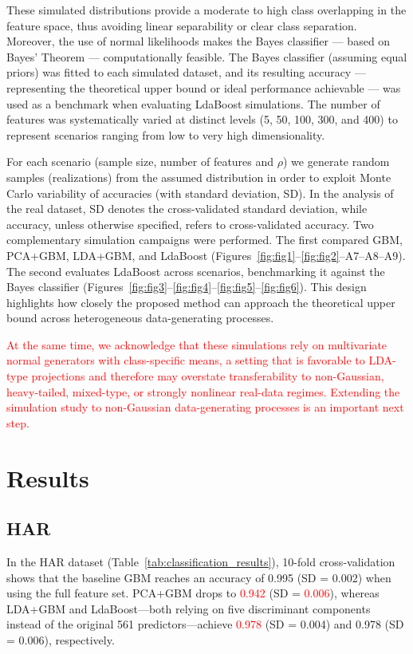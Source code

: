 \documentclass[11pt,a4paper]{article}
\providecommand{\DIFaddtex}[1]{\textcolor{red}{#1}} %
\providecommand{\DIFaddbegin}{} %
\providecommand{\DIFaddend}{} %
\providecommand{\DIFadd}[1]{\texorpdfstring{\DIFaddtex{#1}}{#1}} %
\begin{document}
These simulated distributions provide a moderate to high class overlapping in the feature space, thus avoiding linear separability or clear class separation. Moreover, the use of normal likelihoods makes the Bayes classifier — based on Bayes' Theorem — computationally feasible. The Bayes classifier (assuming equal priors) was fitted to each simulated dataset, and its resulting accuracy — representing the theoretical upper bound or ideal performance achievable — was used as a benchmark when evaluating LdaBoost simulations.
The number of features was systematically varied at distinct levels (5, 50, 100, 300, and 400) to represent scenarios ranging from low to very high dimensionality. 

For each scenario (sample size, number of features and $\rho$) we generate random samples (realizations) from the assumed distribution in order to exploit Monte Carlo variability of accuracies (with standard deviation, SD). 
In the analysis of the real dataset, SD denotes the cross-validated standard deviation, while accuracy, unless otherwise specified, refers to cross-validated accuracy.
Two complementary simulation campaigns were performed. The first compared GBM, PCA+GBM, LDA+GBM, and LdaBoost (Figures~\ref{fig:fig1}--\ref{fig:fig2}--A7--A8--A9). 
The second evaluates LdaBoost across scenarios, benchmarking it against the Bayes classifier (Figures~\ref{fig:fig3}--\ref{fig:fig4}--\ref{fig:fig5}--\ref{fig:fig6}). This design highlights how closely the proposed method can approach the theoretical upper bound across heterogeneous data-generating processes.

\DIFaddbegin \DIFadd{At the same time, we acknowledge that these simulations rely on multivariate normal generators with class-specific means, a setting that is favorable to LDA-type projections and therefore may overstate transferability to non-Gaussian, heavy-tailed, mixed-type, or strongly nonlinear real-data regimes. Extending the simulation study to non-Gaussian data-generating processes is an important next step.
}

\DIFaddend \section*{Results}
\subsection*{HAR}
In the HAR dataset (Table~\ref{tab:classification_results}), 10-fold cross-validation shows that the baseline GBM reaches an accuracy of 0.995 (SD = 0.002) when using the full feature set. PCA+GBM drops to  \DIFaddbegin \DIFadd{0.942 }\DIFaddend (SD =  \DIFaddbegin \DIFadd{0.006}\DIFaddend ), whereas LDA+GBM and LdaBoost---both relying on five discriminant components instead of the original 561 predictors---achieve  \DIFaddbegin \DIFadd{0.978 }\DIFaddend (SD = 0.004) and 0.978 (SD = 0.006), respectively.
\end{document}
